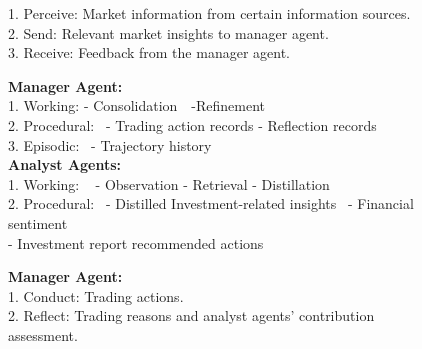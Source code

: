 \begin{figure}[ht]
\begin{tcbraster}[raster columns=1]
\begin{tcolorbox}[colback=white, colframe=lightorange, title=Perception Module, boxsep=2pt, top=2pt, bottom=2pt]
    1. Perceive: Market information from certain information sources.\\
    2. Send: Relevant market insights to manager agent.\\
    3. Receive: Feedback from the manager agent.
    \end{tcolorbox}
    \begin{tcolorbox}[colback=white, colframe=lightyellow, title=Memory Module, boxsep=2pt, top=2pt, bottom=2pt]
    \raggedright
    \textbf{Manager Agent:}\\   
    1. Working:   \; \; \quad \quad   - Consolidation \qquad \qquad \qquad \,\, -Refinement\\
    2. Procedural: \ \quad \quad - Trading action records  \qquad \quad  - Reflection records\\      
    3. Episodic:  \; \, \quad \quad   - Trajectory history \\   
    \textbf{Analyst Agents:}\\
    1. Working: \ \; \; \quad \quad - Observation \qquad \quad - Retrieval \qquad \quad - Distillation\\
    2. Procedural:  \, \quad \quad - Distilled Investment-related insights   \; \
    - Financial sentiment\\
    \qquad \qquad \qquad \qquad \;  - Investment report recommended actions 		   
    \end{tcolorbox}
    \begin{tcolorbox}[colback=white, colframe=lightred, title=Action Module, boxsep=2pt, top=2pt, bottom=2pt]
    \textbf{Manager Agent:}\\
    1. Conduct: Trading actions. \\
    2. Reflect:  Trading reasons and analyst agents' contribution assessment.
    \end{tcolorbox}
\end{tcbraster}
\caption{}
\label{fig2:modular_design}
\end{figure}

\newpage
